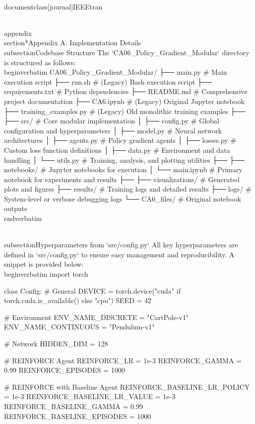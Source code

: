 \\documentclass[journal]{IEEEtran}
\begin{document}
\\appendix
\\section*{Appendix A: Implementation Details}
\\subsection{Codebase Structure}
The `CA06_Policy_Gradient_Modular` directory is structured as follows:
\\begin{verbatim}
CA06_Policy_Gradient_Modular/
├── main.py                     # Main execution script
├── run.sh                      # (Legacy) Bash execution script
├── requirements.txt            # Python dependencies
├── README.md                   # Comprehensive project documentation
├── CA6.ipynb                   # (Legacy) Original Jupyter notebook
├── training_examples.py        # (Legacy) Old monolithic training examples
├──
├── src/                        # Core modular implementation
│   ├── config.py               # Global configuration and hyperparameters
│   ├── model.py                # Neural network architectures
│   ├── agents.py               # Policy gradient agents
│   ├── losses.py               # Custom loss function definitions
│   ├── data.py                 # Environment and data handling
│   └── utils.py                # Training, analysis, and plotting utilities
├──
├── notebooks/                  # Jupyter notebooks for execution
│   └── main.ipynb              # Primary notebook for experiments and results
├──
├── visualizations/             # Generated plots and figures
├── results/                    # Training logs and detailed results
├── logs/                       # System-level or verbose debugging logs
└── CA6_files/                  # Original notebook outputs
\\end{verbatim}

\\subsection{Hyperparameters from `src/config.py`}
All key hyperparameters are defined in `src/config.py` to ensure easy management and reproducibility. A snippet is provided below:
\\begin{verbatim}
import torch

class Config:
    # General
    DEVICE = torch.device("cuda" if torch.cuda.is_available() else "cpu")
    SEED = 42

    # Environment
    ENV_NAME_DISCRETE = "CartPole-v1"
    ENV_NAME_CONTINUOUS = "Pendulum-v1"

    # Network
    HIDDEN_DIM = 128

    # REINFORCE Agent
    REINFORCE_LR = 1e-3
    REINFORCE_GAMMA = 0.99
    REINFORCE_EPISODES = 1000

    # REINFORCE with Baseline Agent
    REINFORCE_BASELINE_LR_POLICY = 1e-3
    REINFORCE_BASELINE_LR_VALUE = 1e-3
    REINFORCE_BASELINE_GAMMA = 0.99
    REINFORCE_BASELINE_EPISODES = 1000
\end{document}
